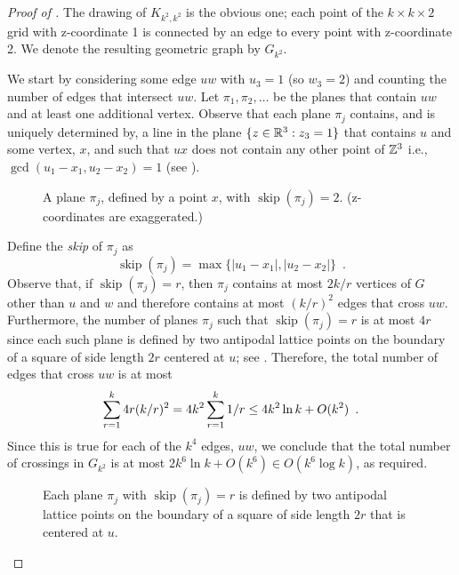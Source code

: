 \documentclass{patmorin}
\DeclareMathOperator{\skp}{skip}
\begin{document}
\begin{proof}[Proof of ]
  The drawing of $K_{k^2,k^2}$ is the obvious one; each point of the
  $k\times k\times2$ grid with z-coordinate 1 is connected by an edge
  to every point with z-coordinate 2.  We denote the resulting
  geometric graph by $G_{k^2}$.

  We start by considering some edge $uw$ with $u_3=1$ (so
  $w_3=2$) and counting the number of edges that intersect $uw$.
  Let $\pi_1,\pi_2,\ldots$ be the planes that contain $uw$ and at least
  one additional vertex.  Observe that each plane $\pi_j$ contains, and
  is uniquely determined by, a line in the plane $\{z\in\mathbb{R}^3: z_3=1\}$
  that contains $u$ and some vertex, $x$, and such that $ux$ does not
  contain any other point of $\mathbb{Z}^3$ i.e.,
  $\gcd(u_1-x_1,u_2-x_2)=1$ (see ).
  \begin{figure}
    \caption{A plane $\pi_j$, defined by a point $x$, with
      $\skp(\pi_j)=2$. (z-coordinates are exaggerated.)}
  \end{figure}
  Define the \emph{skip} of $\pi_j$ as
  \[
     \skp(\pi_j)=\max\{|u_1-x_1|,|u_2-x_2|\} \enspace .
  \]
  Observe that, if $\skp(\pi_j)=r$, then $\pi_j$ contains at most $2k/r$
  vertices of $G$ other than $u$ and $w$ and therefore contains at most
  $(k/r)^2$ edges that cross $uw$.  Furthermore, the number of planes
  $\pi_j$ such that $\skp(\pi_j)=r$ is at most $4r$ since each such
  plane is defined by two antipodal lattice points on the boundary of a
  square of side length $2r$ centered at $u$; see .
  Therefore, the total number of edges that cross $uw$ is at most
  \begin{equation}
     \sum_{r=1}^k 4r(k/r)^2 = 4k^2\sum_{r=1}^k 1/r 
       \le 4k^2\ln k + O(k^2) \enspace .
        \eqlabel{critical}
  \end{equation}
  Since this is true for each of the $k^4$ edges, $uw$, we conclude
  that the total number of crossings in $G_{k^2}$ is at most $2k^6\ln
  k+O(k^6)\in O(k^6\log k)$, as required.
  \begin{figure}
    \caption{Each plane $\pi_j$ with $\skp(\pi_j)=r$ is defined by two
      antipodal lattice points on the boundary of a square of side length
      $2r$ that is centered at $u$.}
  \end{figure}
\end{proof}
\end{document}
